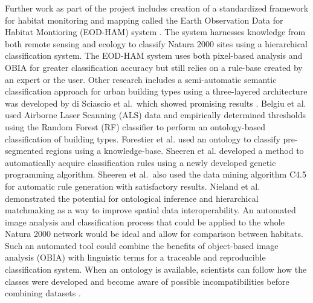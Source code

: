 \documentclass[authoryear, review,12pt,number]{elsarticle}
\begin{document}
Further work as part of the project includes creation of a standardized
framework for habitat monitoring and mapping called the Earth Observation Data
for Habitat Montioring (EOD-HAM) system \citep{Lucas2015}. The system harnesses
knowledge from both remote sensing and ecology to classify Natura 2000 sites
using a hierarchical classification system. The EOD-HAM system uses both
pixel-based analysis and OBIA for greater classification accuracy but still
relies on a rule-base created by an expert or the user. Other research includes
a semi-automatic semantic classification approach for urban building types using
a three-layered architecture was developed by di Sciascio et al.\ which showed
promising results \citep{diSciascio2013}. Belgiu et al. \citep{Belgiu2014} used
Airborne Laser Scanning (ALS) data and empirically determined thresholds using
the Random Forest (RF) classifier to perform an ontology-based classification of
building types. Forestier et al. \citep{Forestier2012470} used an ontology to
classify pre-segmented regions using a knowledge-base. Sheeren et al.
\citep{Sheeren2006ML} developed a method to automatically acquire classification
rules using a newly developed genetic programming algorithm.
Sheeren et al.\ also used the data mining algorithm C4.5 for automatic rule
generation with satisfactory results. Nieland et al. \citep{Nieland2015}
demonstrated the potential for ontological inference and hierarchical
matchmaking as a way to improve spatial data interoperability. An automated
image analysis and classification process that could be applied to the whole
Natura 2000 network would be ideal and allow for comparison between habitats.
Such an automated tool could combine the benefits of object-based image analysis
(OBIA) with linguistic terms for a traceable and reproducible classification
system. When an ontology is available, scientists can follow how the classes
were developed and become aware of possible incompatibilities before combining
datasets \citep{Janowicz2012}.

\end{document}
